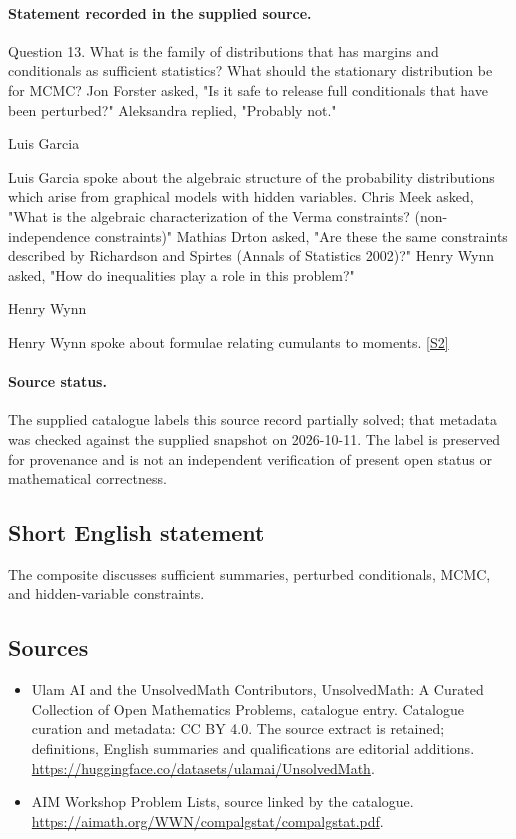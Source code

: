 \documentclass[11pt]{article}
\begin{document}
\paragraph{Statement recorded in the supplied source.}
Question 13. What is the family of distributions that has margins and conditionals as sufficient statistics? What should the stationary distribution be for MCMC? Jon Forster asked, "Is it safe to release full conditionals that have been perturbed?" Aleksandra replied, "Probably not."

Luis Garcia

Luis Garcia spoke about the algebraic structure of the probability distributions which arise from graphical models with hidden variables. Chris Meek asked, "What is the algebraic characterization of the Verma constraints? (non-independence constraints)" Mathias Drton asked, "Are these the same constraints described by Richardson and Spirtes (Annals of Statistics 2002)?" Henry Wynn asked, "How do inequalities play a role in this problem?"

Henry Wynn

Henry Wynn spoke about formulae relating cumulants to moments. \href{https://aimath.org/WWN/compalgstat/compalgstat.pdf}{[S2]}
\paragraph{Source status.}
The supplied catalogue labels this source record partially solved; that metadata was checked against the supplied snapshot on 2026-10-11. The label is preserved for provenance and is not an independent verification of present open status or mathematical correctness.
\subsection{Short English statement}
The composite discusses sufficient summaries, perturbed conditionals, MCMC, and hidden-variable constraints.
\subsection{Sources}
\begin{itemize}
\item[S1] Ulam AI and the UnsolvedMath Contributors, UnsolvedMath: A Curated Collection of Open Mathematics Problems, catalogue entry. Catalogue curation and metadata: CC BY 4.0. The source extract is retained; definitions, English summaries and qualifications are editorial additions.
\url{https://huggingface.co/datasets/ulamai/UnsolvedMath}.
\item[S2] AIM Workshop Problem Lists, source linked by the catalogue.
\url{https://aimath.org/WWN/compalgstat/compalgstat.pdf}.
\end{itemize}
\end{document}
